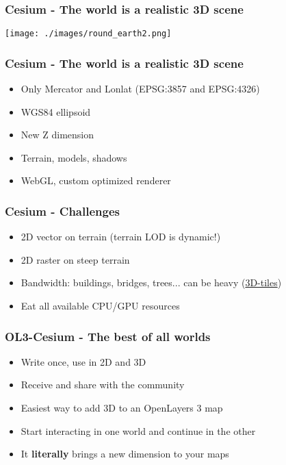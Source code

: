 \documentclass[handout]{beamer}
\begin{document}
  \begin{frame}
    \frametitle{Cesium - The world is a realistic 3D scene}
    \begin{center}
     \texttt{[image: ./images/round\_earth2.png]}
    \end{center}
    \end{frame}


  \begin{frame}
    \frametitle{Cesium - The world is a realistic 3D scene}
    \begin{itemize}
      \pause\item Only Mercator and Lonlat (EPSG:3857 and EPSG:4326)
      \pause\item WGS84 ellipsoid
      \pause\item New Z dimension
      \pause\item Terrain, models, shadows
      \pause\item WebGL, custom optimized renderer
    \end{itemize}
  \end{frame}


  \begin{frame}
    \frametitle{Cesium - Challenges}
    \begin{itemize}
      \pause\item 2D vector on terrain (terrain LOD is dynamic!)
      \pause\item 2D raster on steep terrain
      \pause\item Bandwidth: buildings, bridges, trees... can be heavy (\href {https://github.com/AnalyticalGraphicsInc/3d-tiles}{3D-tiles})
      \pause\item Eat all available CPU/GPU resources
    \end{itemize}

   \end{frame}


  \begin{frame}
    \frametitle{OL3-Cesium - The best of all worlds}
    \begin{itemize}
      \pause\item Write once, use in 2D and 3D
      \pause\item Receive and share with the community
      \pause\item Easiest way to add 3D to an OpenLayers 3 map
      \pause\item Start interacting in one world and continue in the other
      \pause\item It \textbf{literally} brings a new dimension to your maps
    \end{itemize}
  \end{frame}
\end{document}
